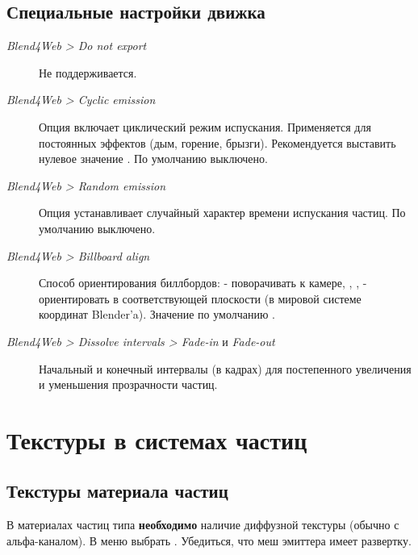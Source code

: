 \documentclass[a4paper,12pt,oneside]{sphinxmanual}
\begin{document}
\subsection{Специальные настройки движка}
\label{particles:id13}\begin{description}
\item[{\emph{Blend4Web \textgreater{} Do not export}}] \leavevmode
Не поддерживается.

\item[{\emph{Blend4Web \textgreater{} Cyclic emission}}] \leavevmode
Опция включает циклический режим испускания. Применяется для постоянных эффектов (дым, горение, брызги). Рекомендуется выставить нулевое значение . По умолчанию выключено.

\item[{\emph{Blend4Web \textgreater{} Random emission}}] \leavevmode
Опция устанавливает случайный характер времени испускания частиц. По умолчанию выключено.

\item[{\emph{Blend4Web \textgreater{} Billboard align}}] \leavevmode
Способ ориентирования биллбордов:  - поворачивать к камере, , ,  - ориентировать в соответствующей плоскости (в мировой системе координат Blender'a). Значение по умолчанию .

\item[{\emph{Blend4Web \textgreater{} Dissolve intervals \textgreater{} Fade-in} и \emph{Fade-out}}] \leavevmode
Начальный и конечный интервалы (в кадрах) для постепенного увеличения и уменьшения прозрачности частиц.

\end{description}


\section{Текстуры в системах частиц}
\label{particles:id14}\label{particles:particles-textures}

\subsection{Текстуры материала частиц}
\label{particles:id15}
В материалах частиц типа  \textbf{необходимо} наличие диффузной текстуры (обычно с альфа-каналом). В меню  выбрать .  Убедиться, что меш эмиттера имеет развертку.
\end{document}
